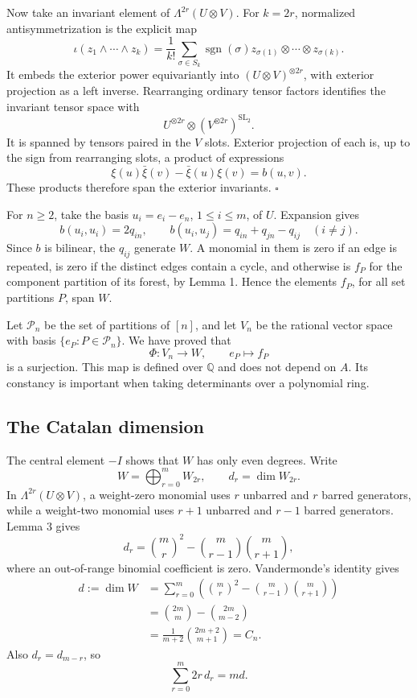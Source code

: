 \documentclass[11pt]{article}
\begin{document}
Now take an invariant element of \(\Lambda^{2r}(U\otimes V)\). For \(k=2r\), normalized antisymmetrization is the explicit map \[
\iota(z_1\wedge\cdots\wedge z_k)=\frac1{k!}\sum_{\sigma\in S_k}\operatorname{sgn}(\sigma)z_{\sigma(1)}\otimes\cdots\otimes z_{\sigma(k)}.
\] It embeds the exterior power equivariantly into \((U\otimes V)^{\otimes2r}\), with exterior projection as a left inverse. Rearranging ordinary tensor factors identifies the invariant tensor space with \[
U^{\otimes2r}\otimes(V^{\otimes2r})^{\mathrm{SL}_2}.
\] It is spanned by tensors paired in the \(V\) slots. Exterior projection of each is, up to the sign from rearranging slots, a product of expressions \[
\xi(u)\bar\xi(v)-\bar\xi(u)\xi(v)=b(u,v).
\] These products therefore span the exterior invariants. \(\square\)

For \(n\geq2\), take the basis \(u_i=e_i-e_n\), \(1\leq i\leq m\), of \(U\). Expansion gives \[
b(u_i,u_i)=2q_{in},\qquad
b(u_i,u_j)=q_{in}+q_{jn}-q_{ij}\quad(i\ne j).
\tag{12}
\] Since \(b\) is bilinear, the \(q_{ij}\) generate \(W\). A monomial in them is zero if an edge is repeated, is zero if the distinct edges contain a cycle, and otherwise is \(f_P\) for the component partition of its forest, by Lemma 1. Hence the elements \(f_P\), for all set partitions \(P\), span \(W\).

Let \(\mathcal P_n\) be the set of partitions of \([n]\), and let \(V_n\) be the rational vector space with basis \(\{e_P:P\in\mathcal P_n\}\). We have proved that \[
\Phi:V_n\longrightarrow W,\qquad e_P\longmapsto f_P
\tag{13}
\] is a surjection. This map is defined over \(\mathbb Q\) and does not depend on \(A\). Its constancy is important when taking determinants over a polynomial ring.

\subsection{The Catalan dimension}\label{the-catalan-dimension}

The central element \(-I\) shows that \(W\) has only even degrees. Write \[
W=\bigoplus_{r=0}^m W_{2r},\qquad d_r=\dim W_{2r}.
\] In \(\Lambda^{2r}(U\otimes V)\), a weight-zero monomial uses \(r\) unbarred and \(r\) barred generators, while a weight-two monomial uses \(r+1\) unbarred and \(r-1\) barred generators. Lemma 3 gives \[
d_r=\binom mr^2-\binom m{r-1}\binom m{r+1},
\tag{14}
\] where an out-of-range binomial coefficient is zero. Vandermonde's identity gives \[
\begin{aligned}
d:=\dim W
&=\sum_{r=0}^m\left(\binom mr^2-\binom m{r-1}\binom m{r+1}\right)\\
&=\binom{2m}{m}-\binom{2m}{m-2}\\
&=\frac1{m+2}\binom{2m+2}{m+1}=C_n.
\end{aligned}
\tag{15}
\] Also \(d_r=d_{m-r}\), so \[
\sum_{r=0}^m 2r\,d_r=m d.
\tag{16}
\]
\end{document}
